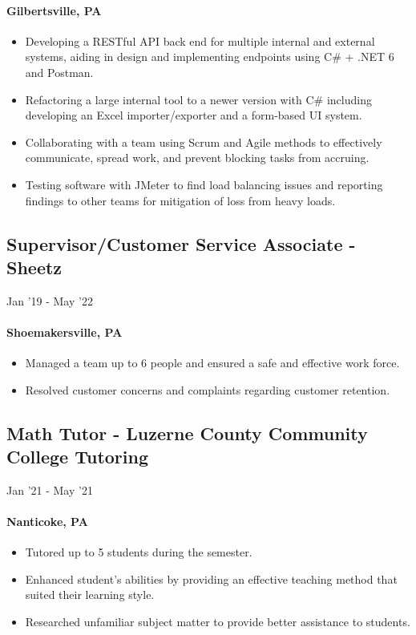 \documentclass{article}
\begin{document}
\paragraph{Gilbertsville, PA}

\begin{itemize}
    \item Developing a RESTful API back end for multiple internal and external systems, aiding in design and implementing endpoints using C\# + .NET 6 and Postman.
    \item Refactoring a large internal tool to a newer version with C\# including developing an Excel importer/exporter and a form-based UI system.
    \item Collaborating with a team using Scrum and Agile methods to effectively communicate, spread work, and prevent blocking tasks from accruing.
    \item Testing software with JMeter to find load balancing issues and reporting findings to other teams for mitigation of loss from heavy loads.
\end{itemize}

\subsection{Supervisor/Customer Service Associate - Sheetz} \hfill Jan '19 - May '22
\paragraph{Shoemakersville, PA}
\begin{itemize}
  \item Managed a team up to 6 people and ensured a safe and effective work force.
  \item Resolved customer concerns and complaints regarding customer retention.
\end{itemize}

\subsection{Math Tutor - Luzerne County Community College Tutoring} \hfill Jan '21 - May '21
\paragraph{Nanticoke, PA}
\begin{itemize}
  \item Tutored up to 5 students during the semester.
  \item Enhanced student’s abilities by providing an effective teaching method that suited their learning style.
  \item Researched unfamiliar subject matter to provide better assistance to students.
\end{itemize}
\end{document}
